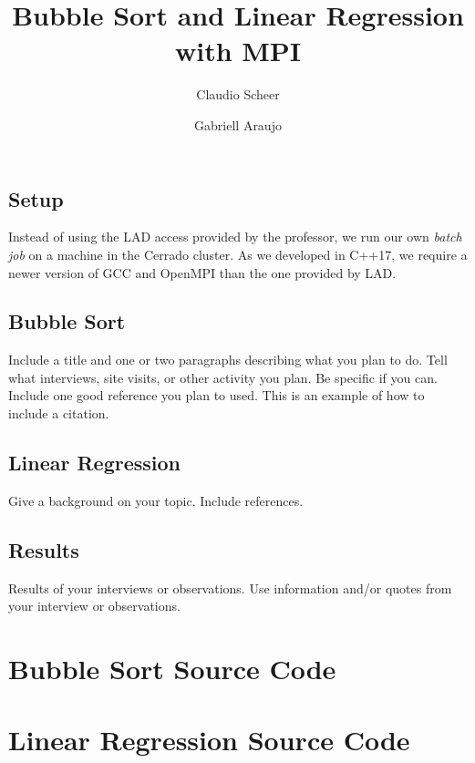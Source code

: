\documentclass[10pt, twocolumn]{report}
\begin{document}
\title{Bubble Sort and Linear Regression with MPI}

\author[1]{Claudio Scheer}
\author[1]{Gabriell Araujo}

\maketitle

\section {Setup}
Instead of using the LAD access provided by the professor, we run our own \textit{batch job} on a machine in the Cerrado cluster. As we developed in C++17, we require a newer version of GCC and OpenMPI than the one provided by LAD.

\section{Bubble Sort}
Include a title and one or two paragraphs describing what you plan to do. Tell what interviews, site visits, or other activity you plan. Be specific if you can. Include  one good reference you plan to used. This is an example of how to include a citation.

\section {Linear Regression}
Give a background on your topic. Include references.

\section{Results}
Results of your interviews or observations. Use information and/or quotes from your interview or observations.

\begin{appendices}
	\chapter{Bubble Sort Source Code}
	
	
	

	\chapter{Linear Regression Source Code}
	
	
	
\end{appendices}
\end{document}
